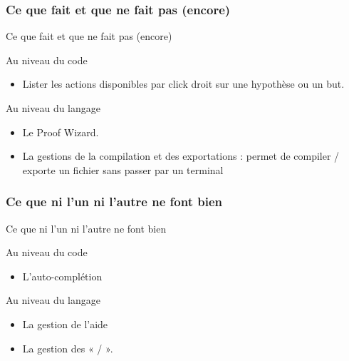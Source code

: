     \subsubsection{Ce que \coqide{} fait et que \coquille{} ne fait pas (encore)}
    
        \begin{frame}{Ce que \coqide{} fait et que \coquille{} ne fait pas (encore)}
            \begin{block}{Au niveau du code}
                \begin{itemize}
                    \item Lister les actions disponibles par click droit sur une hypothèse ou un but.
                \end{itemize}
            \end{block}
            \pause
            \begin{block}{Au niveau du langage}
                \begin{itemize}
                    \item Le Proof Wizard.
                    \item La gestions de la compilation et des exportations : \coqide{} permet de compiler / exporte un fichier sans passer par un terminal
                \end{itemize}
            \end{block}
        \end{frame}

    \subsubsection{Ce que ni l'un ni l'autre ne font bien}

        \begin{frame}{Ce que ni l'un ni l'autre ne font bien}
            \begin{block}{Au niveau du code}
                \begin{itemize}
                    \item L'auto-complétion
                \end{itemize}
            \end{block}
            \pause
            \begin{block}{Au niveau du langage}
                \begin{itemize}
                    \item La gestion de l'aide
                    \item La gestion des «  /  ».
                \end{itemize}
            \end{block}
        \end{frame}

